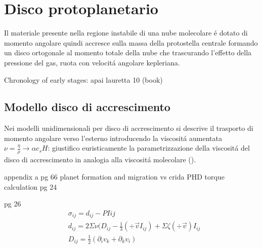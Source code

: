{\let\clearpage\relax\let\cleardoublepage\relax
\chapter{Disco protoplanetario}
}

Il materiale presente nella regione instabile di una nube molecolare \'e dotato di momento angolare quindi accresce sulla massa della protostella centrale formando un disco ortogonale al momento totale della nube che trascurando l'effetto della pressione del gas, ruota con velocit\'a angolare kepleriana.

\begin{workout}
Chronology of  early stages: apai lauretta 10 (book)
\end{workout}

\section{Modello disco di accrescimento}

Nei modelli unidimensionali per disco di accrescimento si descrive il trasporto di momento angolare verso l'esterno introducendo la viscosit\'a aumentata $\nu=\frac{\eta}{\rho}\to\alpha c_s H$: giustifico euristicamente la parametrizzazione della viscosit\'a del disco di accrescimento in analogia alla viscosit\'a molecolare (\cite{bouvier2002theory}).

\begin{workout}
appendix a pg 66 planet formation and migration vs crida PHD torque calculation pg 24
\end{workout}
\begin{workout}
pg 26
\begin{align}
&\sigma_{ij}=d_{ij}-PI{ij}\\
&d_{ij}=2\Sigma\nu(D_{ij}-\frac{1}{3}(\div{\vec{v}}I_{ij})+\Sigma\zeta(\div{\vec{v}})I_{ij}\\
&D_{ij}=\frac{1}{2}(\partial_iv_k+\partial_kv_i)
\end{align}
\end{workout}

